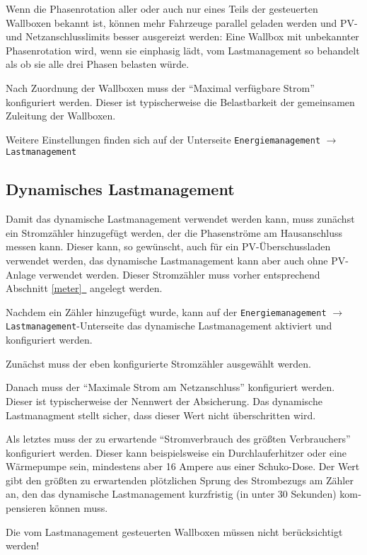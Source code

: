 \documentclass[a4paper,10pt]{article}
\newcommand{\hint}[1]{\begin{tcolorbox}[colback=boxgray,colframe=black,coltext=
white,title=Hinweis,left*=2mm,right*=2mm,boxsep=1mm,bottom=1mm,top=1mm]#1\end{tcolorbox}}
\newcommand*{\fullref}[1]{Abschnitt \hyperref[{#1}]{\ref*{#1}~\nameref*{#1}}}
\begin{document}
\begin{multicols*}{2}
    Wenn die Pha­sen­ro­ta­ti­on aller oder auch nur eines Teils der ge­steu­er­ten Wallboxen bekannt ist, können mehr Fahrzeuge parallel geladen werden und PV- und Netz­an­schluss­li­mits besser aus­ge­reizt werden: Eine Wallbox mit un­be­kann­ter Pha­sen­ro­ta­ti­on wird, wenn sie einphasig lädt, vom Last­manage­ment so behandelt als ob sie alle drei Phasen belasten würde.

    Nach Zuordnung der Wallboxen muss der \enquote{Maximal verfügbare Strom} konfiguriert werden. Dieser ist typischerweise die Belastbarkeit der gemeinsamen Zuleitung der Wallboxen.

    Weitere Einstellungen finden sich auf der Unterseite \texttt{Energiemanagement} $\rightarrow$ \texttt{Lastmanagement}

    \subsection{Dynamisches Lastmanagement}

    Damit das dynamische Lastmanagement verwendet werden kann, muss zunächst ein
    Stromzähler hinzugefügt werden, der die Phasenströme am Hausanschluss messen kann.
    Dieser kann, so gewünscht, auch für ein PV-Überschussladen verwendet werden,
    das dynamische Lastmanagement kann aber auch ohne PV-Anlage verwendet werden. Dieser Stromzähler muss vorher entsprechend \fullref{meter} angelegt werden.

    Nachdem ein Zähler hinzugefügt wurde, kann auf der \texttt{Energiemanagement} $\rightarrow$ \texttt{Lastmanagement}-Unterseite das dynamische Lastmanagement aktiviert und konfiguriert werden.

    Zunächst muss der eben konfigurierte Stromzähler ausgewählt werden.

    Danach muss der \enquote{Maximale Strom am Netzanschluss} konfiguriert werden. Dieser ist typischerweise der Nennwert der Absicherung. Das dynamische Lastmanagment stellt sicher, dass dieser Wert nicht überschritten wird.

    Als letztes muss der zu erwartende \enquote{Stromverbrauch des größten Verbrauchers} konfiguriert werden. Dieser kann beispielsweise ein Durchlauferhitzer oder eine Wärmepumpe sein, mindestens aber 16 Ampere aus einer Schuko-Dose. Der Wert gibt den größten zu er­war­ten­den plötz­li­chen Sprung des Strom­bezugs am Zähler an, den das dy­na­mi­sche Last­manage­ment kurz­fris­tig (in unter 30 Sekunden) kom­pen­sieren können muss.

    \hint{Die vom Last­manage­ment ge­steu­er­ten Wallboxen müssen nicht be­rück­sich­tigt werden!}


\end{multicols*}
\end{document}
